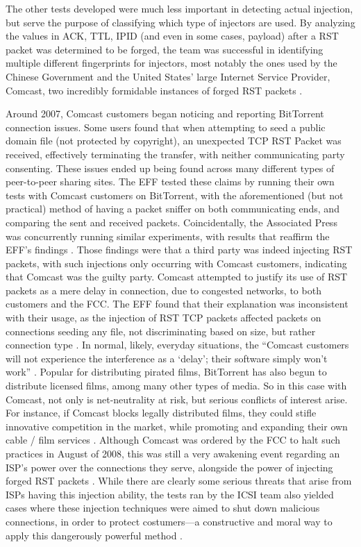 \documentclass[journal]{IEEEtran}
\begin{document}
The other tests developed were much less important in detecting actual injection, but serve the purpose of classifying which type of injectors are used. By analyzing the values in ACK, TTL, IPID (and even in some cases, payload) after a RST packet was determined to be forged, the team was successful in identifying multiple different fingerprints for injectors, most notably the ones used by the Chinese Government and the United States' large Internet Service Provider, Comcast, two incredibly formidable instances of forged RST packets \cite{rstdetection}. 

Around 2007, Comcast customers began noticing and reporting BitTorrent connection issues. Some users found that when attempting to seed a public domain file (not protected by copyright), an unexpected TCP RST Packet was received, effectively terminating the transfer, with neither communicating party consenting. These issues ended up being found across many different types of peer-to-peer sharing sites. The EFF tested these claims by running their own tests with Comcast customers on BitTorrent, with the aforementioned (but not practical) method of having a packet sniffer on both communicating ends, and comparing the sent and received packets. Coincidentally, the Associated Press was concurrently running similar experiments, with results that reaffirm the EFF's findings \cite{rstdetection}. Those findings were that a third party was indeed injecting RST packets, with such injections only occurring with Comcast customers, indicating that Comcast was the guilty party. Comcast attempted to justify its use of RST packets as a mere delay in connection, due to congested networks, to both customers and the FCC. The EFF found that their explanation was inconsistent with their usage, as the injection of RST TCP packets affected packets on connections seeding any file, not discriminating  based on size, but rather connection type . In normal, likely, everyday situations, the ``Comcast customers will not experience the interference as a `delay'; their software simply won't work'' \cite{comcasteff}. Popular for distributing pirated films, BitTorrent has also begun to distribute licensed films, among many other types of media. So in this case with Comcast, not only is net-neutrality at risk, but serious conflicts of interest arise. For instance, if Comcast blocks legally distributed films, they could stifle innovative competition in the market, while promoting and expanding their own cable / film services \cite{comcasteff}. Although Comcast was ordered by the FCC to halt such practices in August of 2008, this was still a very awakening event regarding an ISP's power over the connections they serve, alongside the power of injecting forged RST packets \cite{fcc}. While there are clearly some serious threats that arise from ISPs having this injection ability, the tests ran by the ICSI team also yielded cases where these injection techniques were aimed to shut down malicious connections, in order to protect costumers---a constructive and moral way to apply this dangerously powerful method \cite{rstdetection}.
\end{document}
